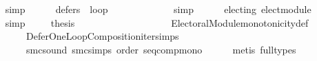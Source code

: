 \begin{isabellebody}
\ \ \ \ \isamarkupfalse%
\ simp\ \isanewline
\ \ \isamarkupfalse%
\ {}{\isacharcolon}{\kern0pt}\ {\isachardoublequoteopen}defers\ {}\ {\isacharquery}{\kern0pt}loop{\isachardoublequoteclose}\isanewline
\ \ \ \ \isamarkupfalse%
\ {}{}\ {}{}\isanewline
\ \ \ \ \isamarkupfalse%
\ simp\ \isanewline
\ \ \isamarkupfalse%
\ {}{\isacharcolon}{\kern0pt}\ {\isachardoublequoteopen}electing\ elect{\isacharunderscore}{\kern0pt}module{\isachardoublequoteclose}\isanewline
\ \ \ \ \isamarkupfalse%
\ simp\ \isanewline
\isanewline
\ \ \isamarkupfalse%
\ {\isacharquery}{\kern0pt}thesis\isanewline
\ \ \ \ \isamarkupfalse%
\ {}\ {}\ {}\ {}\isanewline
\ \ \ \ \ \ \ \ \ \ Electoral{\isacharunderscore}{\kern0pt}Module{\isachardot}{\kern0pt}monotonicity{\isacharunderscore}{\kern0pt}def\isanewline
\ \ \ \ \ \ \ \ \ \ Defer{\isacharunderscore}{\kern0pt}One{\isacharunderscore}{\kern0pt}Loop{\isacharunderscore}{\kern0pt}Composition{\isachardot}{\kern0pt}iter{\isachardot}{\kern0pt}simps\isanewline
\ \ \ \ \ \ \ \ \ \ smc{\isacharunderscore}{\kern0pt}sound\ smc{\isachardot}{\kern0pt}simps\ order\ seq{\isacharunderscore}{\kern0pt}comp{\isacharunderscore}{\kern0pt}mono\isanewline
\ \ \ \ \isamarkupfalse%
\ {\isacharparenleft}{\kern0pt}metis\ {\isacharparenleft}{\kern0pt}full{\isacharunderscore}{\kern0pt}types{\isacharparenright}{\kern0pt}{\isacharparenright}{\kern0pt}\isanewline
{}\isamarkupfalse%
%
\endisatagproof
{\isafoldproof}%
%
\isadelimproof
\isanewline
%
\endisadelimproof
%
\isadelimtheory
\isanewline
%
\endisadelimtheory
%
\isatagtheory
{}\isamarkupfalse%
%
\endisatagtheory
{\isafoldtheory}%
%
\isadelimtheory
%
\endisadelimtheory
%
\end{isabellebody}%
\endinput
